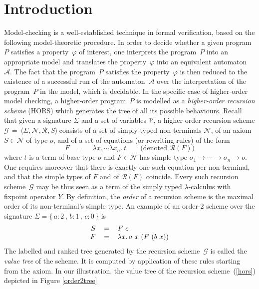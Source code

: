 \documentclass{eptcs}
\newcommand{\G}{$\mathcal{G}\,=\,\langle \Sigma, \mathcal{N},\mathcal{R},S \rangle\ $}
\begin{document}
\section{Introduction}
Model-checking is a well-established technique in formal verification,
based on the following model-theoretic procedure.
In order to decide whether a given program~$P$ satisfies a property~$\varphi$ of interest,
one interprets the program~$P$ into an appropriate model and translates 
the property~$\varphi$ into an equivalent automaton~$\mathcal{A}$.
The fact that the program~$P$ satisfies the property~$\varphi$ is then reduced 
to the existence of a successful run of the automaton~$\mathcal{A}$ 
over the interpretation of the program~$P$ in the model, which is decidable.
In the specific case of higher-order model checking, a higher-order program~$P$ 
is modelled as a \emph{higher-order recursion scheme} (HORS)
which generates the tree of all its possible behaviours.
Recall that given a signature $\Sigma$ and a set of variables $\mathcal{V}$, 
a higher-order recursion scheme \G consists of a set of simply-typed 
non-terminals $\mathcal{N}$,  of an axiom $S \in \mathcal{N}$ of type $o$, and of a set of equations (or rewriting rules) of the form
$$
F \quad = \quad \lambda x_1 \cdots \lambda x_n.\ t \quad \quad \text{(denoted } \mathcal{R}(F) \text{)}
$$
where $t$ is a term of base type $o$ and $F \in \mathcal{N}$ has simple type $\sigma_1 \rightarrow \cdots \rightarrow \sigma_n \rightarrow o$.
One requires moreover that there is exactly one such equation per non-terminal,
and that the simple types of $F$ and of $\mathcal{R}(F)$ coincide.
Every such recursion scheme~$\mathcal{G}$ may be thus seen as a term of the simply typed $\lambda$-calculus with fixpoint operator $Y$.
By definition, the \emph{order} of a recursion scheme is the maximal order of its non-terminal's simple type. 
An example of an order-$2$ scheme over the signature $\Sigma=\{\,a:2 \, , \, b:1 \, , \,  c:0 \, \}$ is
\begin{equation}\label{hors}
\begin{tabular}{rcl}
$S$ & $=$ & $F\ c$\\
$F$ & $=$ & $\lambda x.\, a\ x\ (F\ (b\ x))$\\
\end{tabular}
\end{equation}
The labelled and ranked tree generated by the recursion scheme~$\mathcal{G}$ is called the \emph{value tree} of the scheme. 
It is computed by application of these rules starting from the axiom.
In our illustration, the value tree of the recursion scheme~(\ref{hors}) depicted in Figure \ref{order2tree} 
\end{document}
